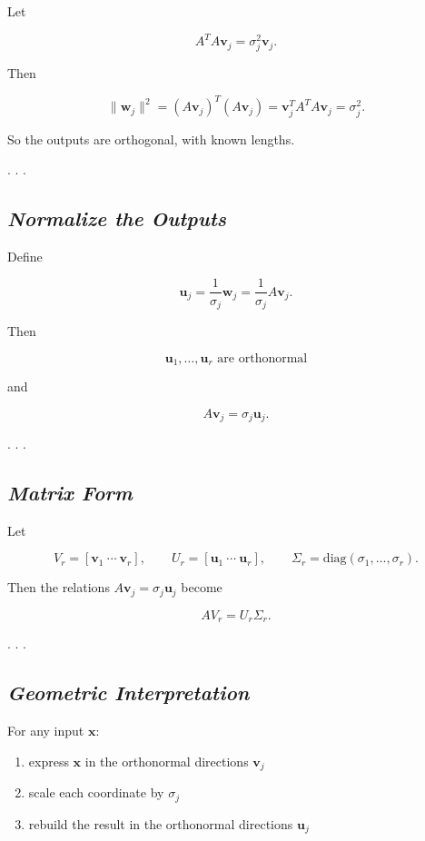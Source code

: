 \documentclass[
  letterpaper,
  DIV=11,
  numbers=noendperiod]{scrartcl}
\providecommand{\tightlist}{%
  \setlength{\itemsep}{0pt}\setlength{\parskip}{0pt}}\usepackage{longtable,booktabs,array}
\begin{document}
Let

\[
A^T A \mathbf{v}_j = \sigma_j^2 \mathbf{v}_j.
\]

Then

\[
\|\mathbf{w}_j\|^2
= (A\mathbf{v}_j)^T(A\mathbf{v}_j)
= \mathbf{v}_j^T A^T A \mathbf{v}_j
= \sigma_j^2.
\]

So the outputs are orthogonal, with known lengths.

. . .

\subsection{\texorpdfstring{\emph{Normalize the
Outputs}}{Normalize the Outputs}}\label{normalize-the-outputs}

Define

\[
\mathbf{u}_j = \frac{1}{\sigma_j} \mathbf{w}_j = \frac{1}{\sigma_j} A\mathbf{v}_j.
\]

Then

\[
 \mathbf{u}_1,\dots,\mathbf{u}_r \text{ are orthonormal}
\]

and

\[
A\mathbf{v}_j = \sigma_j \mathbf{u}_j.
\]

. . .

\subsection{\texorpdfstring{\emph{Matrix
Form}}{Matrix Form}}\label{matrix-form}

Let

\[
V_r = [\mathbf{v}_1\ \cdots\ \mathbf{v}_r],
\qquad
U_r = [\mathbf{u}_1\ \cdots\ \mathbf{u}_r],
\qquad
\Sigma_r = \mathrm{diag}(\sigma_1,\dots,\sigma_r).
\]

Then the relations \(A\mathbf{v}_j = \sigma_j \mathbf{u}_j\) become

\[
A V_r = U_r \Sigma_r.
\]

. . .

\subsection{\texorpdfstring{\emph{Geometric
Interpretation}}{Geometric Interpretation}}\label{geometric-interpretation}

For any input \(\mathbf{x}\):

\begin{enumerate}
\def\labelenumi{\arabic{enumi}.}
\tightlist
\item
  express \(\mathbf{x}\) in the orthonormal directions \(\mathbf{v}_j\)
\item
  scale each coordinate by \(\sigma_j\)
\item
  rebuild the result in the orthonormal directions \(\mathbf{u}_j\)
\end{enumerate}
\end{document}
